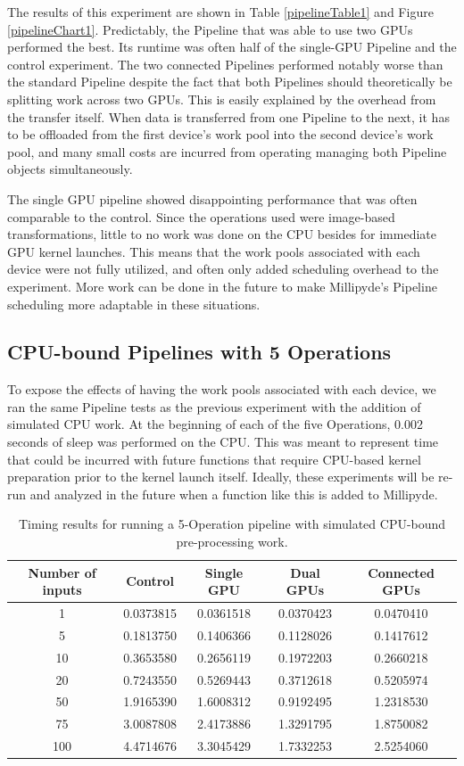 \quad The results of this experiment are shown in Table \ref{pipelineTable1} and Figure \ref{pipelineChart1}. Predictably, the Pipeline that was able to use two GPUs performed the best. Its runtime was often half of the single-GPU Pipeline and the control experiment. The two connected Pipelines performed notably worse than the standard Pipeline despite the fact that both Pipelines should theoretically be splitting work across two GPUs. This is easily explained by the overhead from the transfer itself. When data is transferred from one Pipeline to the next, it has to be offloaded from the first device's work pool into the second device's work pool, and many small costs are incurred from operating managing both Pipeline objects simultaneously. 

\quad The single GPU pipeline showed disappointing performance that was often comparable to the control. Since the operations used were image-based transformations, little to no work was done on the CPU besides for immediate GPU kernel launches. This means that the work pools associated with each device were not fully utilized, and often only added scheduling overhead to the experiment. More work can be done in the future to make Millipyde's Pipeline scheduling more adaptable in these situations.

\subsection{CPU-bound Pipelines with 5 Operations}

To expose the effects of having the work pools associated with each device, we ran the same Pipeline tests as the previous experiment with the addition of simulated CPU work. At the beginning of each of the five Operations, 0.002 seconds of sleep was performed on the CPU. This was meant to represent time that could be incurred with future functions that require CPU-based kernel preparation prior to the kernel launch itself. Ideally, these experiments will be re-run and analyzed in the future when a function like this is added to Millipyde. 

\begin{table}[H]
\centering
\begin{tabular}{ |c|c|c|c|c| } 
\hline
Number of inputs & Control & Single GPU & Dual GPUs & Connected GPUs \\
\hline
1&	0.0373815&	0.0361518&	0.0370423&	0.0470410 \\
5&	0.1813750&	0.1406366&	0.1128026&	0.1417612 \\
10&	0.3653580&	0.2656119&	0.1972203&	0.2660218 \\
20&	0.7243550&	0.5269443&	0.3712618&	0.5205974 \\
50&	1.9165390&	1.6008312&	0.9192495&	1.2318530 \\
75&	3.0087808&	2.4173886&	1.3291795&	1.8750082 \\
100&	4.4714676&	3.3045429&	1.7332253&	2.5254060 \\
\hline
\end{tabular}
\caption{Timing results for running a 5-Operation pipeline with simulated CPU-bound pre-processing work.}
\label{pipelineTable2}
\end{table}

